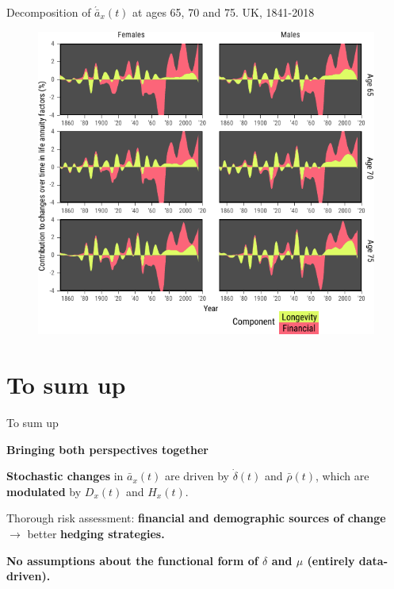 \documentclass[10pt]{beamer}
\begin{document}
\begin{frame}{Decomposition of $\acute{\bar{a}}_x(t)$ at ages 65, 70 and 75. UK, 1841-2018}
\begin{figure}
	\centering
	\hspace*{-0.8cm}
	\includegraphics[scale=0.9] {Fig4.pdf}
\end{figure}
\end{frame}

\section{To sum up}

\begin{frame}{To sum up}

\textbf{Bringing both perspectives together} \pause
\begin{center}
	\pause
\end{center}
\textbf{Stochastic changes} in $\bar{a}_x(t)$ are driven by $\dot{\delta}(t)$ and $\bar{\rho}(t)$, which are \textbf{modulated} by  ${D}_x(t)$ and ${H}_x(t)$. \pause


Thorough risk assessment: \textbf{financial and demographic sources of change}\\ $\rightarrow$ better \textbf{hedging strategies.} \pause

\textbf{No assumptions about the functional form of $\delta$ and $\mu$ (entirely data-driven).}



\end{frame}
\end{document}
